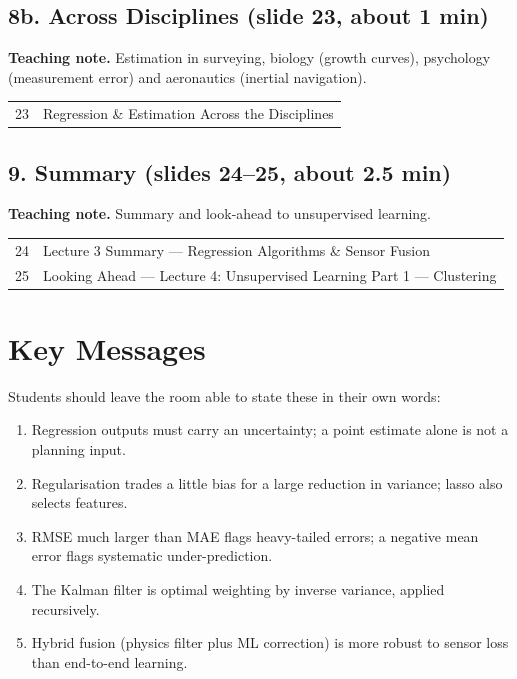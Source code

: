 \documentclass[11pt]{article}
\begin{document}
\subsection{8b. Across Disciplines \normalfont\small\color{GreyN}(slide 23, about 1 min)}

\textbf{Teaching note.} Estimation in surveying, biology (growth curves), psychology (measurement error) and aeronautics (inertial navigation).

\begin{center}\small\renewcommand{\arraystretch}{1.1}\begin{tabularx}{\textwidth}{@{}r X@{}}23 & Regression \& Estimation Across the Disciplines\\\end{tabularx}\end{center}

\subsection{9. Summary \normalfont\small\color{GreyN}(slides 24--25, about 2.5 min)}

\textbf{Teaching note.} Summary and look-ahead to unsupervised learning.

\begin{center}\small\renewcommand{\arraystretch}{1.1}\begin{tabularx}{\textwidth}{@{}r X@{}}24 & Lecture 3 Summary --- Regression Algorithms \& Sensor Fusion\\
25 & Looking Ahead --- Lecture 4: Unsupervised Learning Part 1 --- Clustering\\\end{tabularx}\end{center}

\section{Key Messages}Students should leave the room able to state these in their own words:\begin{keypoint}\begin{enumerate}\item Regression outputs must carry an uncertainty; a point estimate alone is not a planning input.\item Regularisation trades a little bias for a large reduction in variance; lasso also selects features.\item RMSE much larger than MAE flags heavy-tailed errors; a negative mean error flags systematic under-prediction.\item The Kalman filter is optimal weighting by inverse variance, applied recursively.\item Hybrid fusion (physics filter plus ML correction) is more robust to sensor loss than end-to-end learning.\end{enumerate}\end{keypoint}
\end{document}

